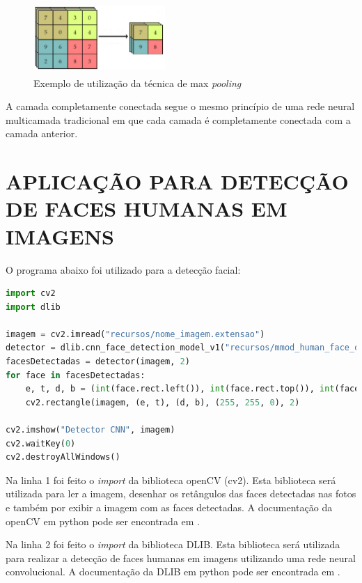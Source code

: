 \documentclass[conference]{IEEEtran}
\begin{document}
       \begin{figure}[h!b]
			\centering \includegraphics[width=5cm,height=2.7cm]{max-pooling.jpg}
			\caption{Exemplo de utilização da técnica de max \textit{pooling} \cite{b2}} 
		\end{figure}         
         
          A camada completamente conectada segue o mesmo princípio de uma rede neural multicamada tradicional em que cada camada é completamente conectada com a camada anterior.             
         
	 \section{APLICAÇÃO PARA DETECÇÃO DE FACES HUMANAS EM IMAGENS}
	 
          O programa abaixo foi utilizado para a detecção facial:	   
         
		  \begin{lstlisting}[breaklines=true, language=Python, caption=Programa utilizado para detecção facial]
import cv2
import dlib

imagem = cv2.imread("recursos/nome_imagem.extensao")
detector = dlib.cnn_face_detection_model_v1("recursos/mmod_human_face_detector.dat")
facesDetectadas = detector(imagem, 2)
for face in facesDetectadas:
    e, t, d, b = (int(face.rect.left()), int(face.rect.top()), int(face.rect.right()), int(face.rect.bottom()))
    cv2.rectangle(imagem, (e, t), (d, b), (255, 255, 0), 2)

cv2.imshow("Detector CNN", imagem)
cv2.waitKey(0)
cv2.destroyAllWindows()\end{lstlisting}


         Na linha 1 foi feito o \textit{import} da biblioteca openCV (cv2). Esta biblioteca será utilizada para ler a imagem, desenhar os retângulos das faces detectadas nas fotos e também por exibir a imagem com as faces detectadas. A documentação da openCV em python pode ser encontrada em \cite{b3}.
         
         Na linha 2 foi feito o \textit{import} da biblioteca DLIB. Esta biblioteca será utilizada para realizar a detecção de faces humanas em imagens utilizando uma rede neural convolucional. A documentação da DLIB em python pode ser encontrada em \cite{b4}.
         
\end{document}
